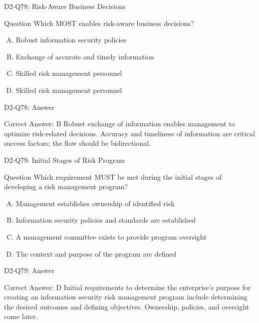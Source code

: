 \documentclass{beamer}
\begin{document}
	\begin{frame}{D2-Q78: Risk-Aware Business Decisions}
		\begin{block}{Question}
			Which MOST enables risk-aware business decisions?
		\end{block}
		\begin{enumerate}[(A)]
			\item Robust information security policies
			\item Exchange of accurate and timely information
			\item Skilled risk management personnel
			\item Skilled risk management personnel
		\end{enumerate}
	\end{frame}
	\begin{frame}{D2-Q78: Answer}
		\begin{block}{Correct Answer: B}
			Robust exchange of information enables management to optimize risk-related decisions. Accuracy and timeliness of information are critical success factors; the flow should be bidirectional.
		\end{block}
	\end{frame}
	
	\begin{frame}{D2-Q79: Initial Stages of Risk Program}
		\begin{block}{Question}
			Which requirement MUST be met during the initial stages of developing a risk management program?
		\end{block}
		\begin{enumerate}[(A)]
			\item Management establishes ownership of identified risk
			\item Information security policies and standards are established
			\item A management committee exists to provide program oversight
			\item The context and purpose of the program are defined
		\end{enumerate}
	\end{frame}
	\begin{frame}{D2-Q79: Answer}
		\begin{block}{Correct Answer: D}
			Initial requirements to determine the enterprise's purpose for creating an information security risk management program include determining the desired outcomes and defining objectives. Ownership, policies, and oversight come later.
		\end{block}
	\end{frame}
	
\end{document}
